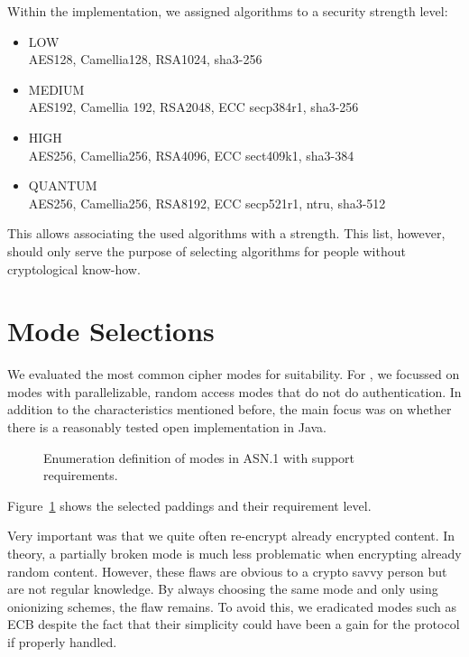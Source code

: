 Within the implementation, we assigned algorithms to a security strength level:
\begin{itemize}
	\item LOW\\
	AES128, Camellia128, RSA1024, sha3-256
	\item MEDIUM\\
	AES192, Camellia 192, RSA2048, ECC secp384r1, sha3-256
	\item HIGH\\
	AES256, Camellia256, RSA4096, ECC sect409k1, sha3-384
	\item QUANTUM\\
	AES256, Camellia256, RSA8192, ECC secp521r1, ntru, sha3-512
\end{itemize}

This allows associating the used algorithms with a strength. This list, however, should only serve the purpose of selecting algorithms for people without cryptological know-how.

\section{Mode Selections}\label{sec:modeSelection}
We evaluated the most common cipher modes for suitability. For \MessageVortex, we focussed on modes with parallelizable, random access modes that do not do authentication. In addition to the characteristics mentioned before, the main focus was on whether there is a reasonably tested open implementation in Java.

\begin{figure}[ht]
	
	\caption{Enumeration definition of modes in ASN.1 with support requirements.}
	\label{fig:defModes}
\end{figure}

Figure~\ref{fig:defModes} shows the selected paddings and their requirement level.

Very important was that we quite often re-encrypt already encrypted content. In theory, a partially broken mode is much less problematic when encrypting already random content. However, these flaws are obvious to a crypto savvy person but are not regular knowledge. By always choosing the same mode and only using onionizing schemes, the flaw remains. To avoid this, we eradicated modes such as ECB despite the fact that their simplicity could have been a gain for the protocol if properly handled.

